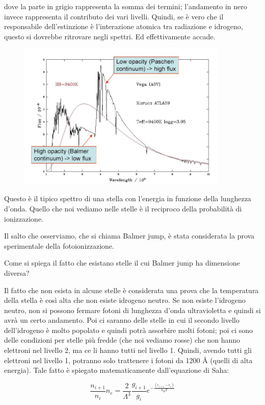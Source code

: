 dove la parte in grigio rappresenta la somma dei termini; l'andamento in nero invece rappresenta il contributo dei vari livelli. Quindi, se è vero che il responsabile dell'estinzione è l'interazione atomica tra radiazione e idrogeno, questo si dovrebbe ritrovare negli spettri. Ed effettivamente accade.

\begin{figure}[H]
  \centering
  \includegraphics[width=10cm]{spettro_stella.jpg}
\end{figure}

Questo è il tipico spettro di una stella con l'energia in funzione della lunghezza d'onda. Quello che noi vediamo nelle stelle è il reciproco della probabilità di ionizzazione.

Il salto che osserviamo, che si chiama Balmer jump, è stata considerata la prova sperimentale della fotoionizzazione.

\vspace{0.2cm}Come si spiega il fatto che esistano stelle il cui Balmer jump ha dimensione diversa?

Il fatto che non esista in alcune stelle è considerata una prova che la temperatura della stella è così alta che non esiste idrogeno neutro. Se non esiste l'idrogeno neutro, non si possono fermare fotoni di lunghezza d'onda ultravioletta e quindi si avrà un certo andamento. Poi ci saranno delle stelle in cui il secondo livello dell'idrogeno è molto popolato e quindi potrà assorbire molti fotoni; poi ci sono delle condizioni per stelle più fredde (che noi vediamo rosse) che non hanno elettroni nel livello 2, ma ce li hanno tutti nel livello 1. Quindi, avendo tutti gli elettroni nel livello 1, potranno solo trattenere i fotoni da 1200 Å (quelli di alta energia). Tale fatto è spiegato matematicamente dall'equazione di Saha:

$$\frac{n_{i+1}}{n_{i}} n_{e}= \frac{2}{\Lambda^3} \frac{g_{i+1}}{g_{i}} e^{-\frac{(\epsilon_{i+1} - \epsilon_i)}{k_BT}}$$

